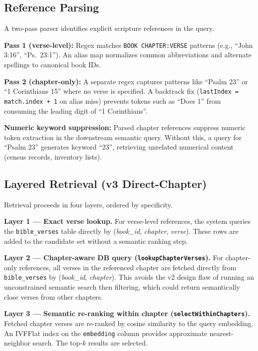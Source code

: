 \documentclass[11pt]{article}
\begin{document}
\subsection{Reference Parsing}

A two-pass parser identifies explicit scripture references in the query.

\textbf{Pass 1 (verse-level):} Regex matches \texttt{BOOK CHAPTER:VERSE} patterns (e.g., ``John 3:16'', ``Ps.\ 23:1''). An alias map normalizes common abbreviations and alternate spellings to canonical book IDs.

\textbf{Pass 2 (chapter-only):} A separate regex captures patterns like ``Psalm 23'' or ``1 Corinthians 15'' where no verse is specified. A backtrack fix (\texttt{lastIndex = match.index + 1} on alias miss) prevents tokens such as ``Does 1'' from consuming the leading digit of ``1 Corinthians''.

\textbf{Numeric keyword suppression:} Parsed chapter references suppress numeric token extraction in the downstream semantic query. Without this, a query for ``Psalm 23'' generates keyword ``23'', retrieving unrelated numerical content (census records, inventory lists).

\subsection{Layered Retrieval (v3 Direct-Chapter)}

Retrieval proceeds in four layers, ordered by specificity.

\textbf{Layer 1 --- Exact verse lookup.} For verse-level references, the system queries the \texttt{bible\_verses} table directly by (\textit{book\_id}, \textit{chapter}, \textit{verse}). These rows are added to the candidate set without a semantic ranking step.

\textbf{Layer 2 --- Chapter-aware DB query (\texttt{lookupChapterVerses}).} For chapter-only references, all verses in the referenced chapter are fetched directly from \texttt{bible\_verses} by (\textit{book\_id}, \textit{chapter}). This avoids the v2 design flaw of running an unconstrained semantic search then filtering, which could return semantically close verses from other chapters.

\textbf{Layer 3 --- Semantic re-ranking within chapter (\texttt{selectWithinChapters}).} Fetched chapter verses are re-ranked by cosine similarity to the query embedding. An IVFFlat index on the \texttt{embedding} column provides approximate nearest-neighbor search. The top-$k$ results are selected.
\end{document}
